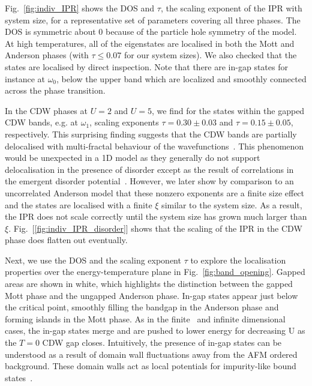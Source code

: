 Fig.~\ref{fig:indiv_IPR} shows the \ac{DOS} and \(\tau\), the scaling exponent of the IPR with system size, for a representative set of parameters covering all three phases. The DOS is symmetric about \(0\) because of the particle hole symmetry of the model. At high temperatures, all of the eigenstates are localised in both the Mott and Anderson phases (with \(\tau \leq 0.07\) for our system sizes). We also checked that the states are localised by direct inspection. Note that there are in-gap states for instance at \(\omega_0\), below the upper band which are localized and smoothly connected across the phase transition. 

In the CDW phases at \(U=2\) and \(U=5\), we find for the states within the gapped CDW bands, e.g. at \(\omega_1\), scaling exponents \(\tau = 0.30\pm0.03\) and \(\tau = 0.15\pm0.05\), respectively. This surprising finding suggests that the CDW bands are partially delocalised with multi-fractal behaviour of the wavefunctions~\cite{eversAndersonTransitions2008a}. This phenomenon would be unexpected in a 1D model as they generally do not support delocalisation in the presence of disorder except as the result of correlations in the emergent disorder potential~\cite{croyAndersonLocalization1D2011,goldshteinPurePointSpectrum1977a}. However, we later show by comparison to an uncorrelated Anderson model that these nonzero exponents are a finite size effect and the states are localised with a finite \(\xi\) similar to the system size. As a result, the IPR does not scale correctly until the system size has grown much larger than \(\xi\). Fig.~[\ref{fig:indiv_IPR_disorder}] shows that the scaling of the IPR in the CDW phase does flatten out eventually. 

Next, we use the \ac{DOS} and the scaling exponent \(\tau\) to explore the localisation properties over the energy-temperature plane in Fig.~\ref{fig:band_opening}. Gapped areas are shown in white, which highlights the distinction between the gapped Mott phase and the ungapped Anderson phase. In-gap states appear just below the critical point, smoothly filling the bandgap in the Anderson phase and forming islands in the Mott phase. As in the finite~\cite{zondaGaplessRegimeCharge2019} and infinite dimensional~\cite{hassanSpectralPropertiesChargedensitywave2007} cases, the in-gap states merge and are pushed to lower energy for decreasing U as the \(T=0\) CDW gap closes. 
Intuitively, the presence of in-gap states can be understood as a result of domain wall fluctuations away from the AFM ordered background. These domain walls act as local potentials for impurity-like bound states~\cite{zondaGaplessRegimeCharge2019}. 


